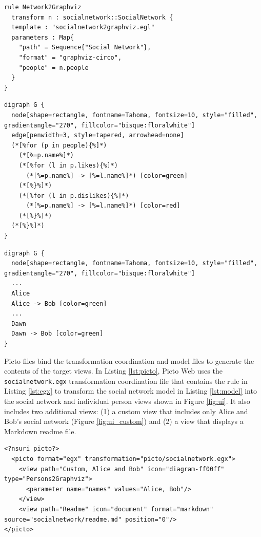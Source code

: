 \documentclass[sigconf,review]{acmart}
\begin{document}
\begin{lstlisting}[firstnumber=1,style=egx,caption={The Network2Graphviz EGX rule},label=lst:egx]
rule Network2Graphviz 
  transform n : socialnetwork::SocialNetwork {
  template : "socialnetwork2graphviz.egl"
  parameters : Map{
    "path" = Sequence{"Social Network"},
    "format" = "graphviz-circo",
    "people" = n.people
  }
}
\end{lstlisting}


\begin{lstlisting}[firstnumber=1,style=egx,caption={An EGL template that generates a Graphviz representation of a social network.},label=lst:egl]
digraph G {
  node[shape=rectangle, fontname=Tahoma, fontsize=10, style="filled", gradientangle="270", fillcolor="bisque:floralwhite"]
  edge[penwidth=3, style=tapered, arrowhead=none]
  (*[%for (p in people){%]*)
    (*[%=p.name%]*)
    (*[%for (l in p.likes){%]*)
      (*[%=p.name%] -> [%=l.name%]*) [color=green]
    (*[%}%]*)
    (*[%for (l in p.dislikes){%]*)
      (*[%=p.name%] -> [%=l.name%]*) [color=red]
    (*[%}%]*)
  (*[%}%]*)
}
\end{lstlisting}

\begin{lstlisting}[firstnumber=1,style=egx,caption={A view generated by the EGL template in Listing \ref{lst:egl}.},label=lst:output]
digraph G {
  node[shape=rectangle, fontname=Tahoma, fontsize=10, style="filled", gradientangle="270", fillcolor="bisque:floralwhite"]
  ...
  Alice
  Alice -> Bob [color=green]
  ...
  Dawn
  Dawn -> Bob [color=green] 
}
\end{lstlisting}

Picto files bind the transformation coordination and model files to generate the contents of the target views. In Listing \ref{lst:picto}, Picto Web uses the \texttt{socialnetwork.egx} transformation coordination file that contains the rule in Listing \ref{lst:egx} to transform the social network model in Listing \ref{lst:model} into the social network and individual person views shown in Figure \ref{fig:ui}. It also includes two additional views: (1) a custom view that includes only Alice and Bob's social network (Figure \ref{fig:ui_custom}) and (2) a view that displays a Markdown readme file.

\begin{lstlisting}[firstnumber=1,style=picto,caption={The Picto file that binds the model and the visualisation transformation.},label=lst:picto]
<?nsuri picto?>
  <picto format="egx" transformation="picto/socialnetwork.egx">
    <view path="Custom, Alice and Bob" icon="diagram-ff00ff" type="Persons2Graphviz">
      <parameter name="names" values="Alice, Bob"/>
    </view>        
    <view path="Readme" icon="document" format="markdown" source="socialnetwork/readme.md" position="0"/>
</picto>
\end{lstlisting}
\end{document}
